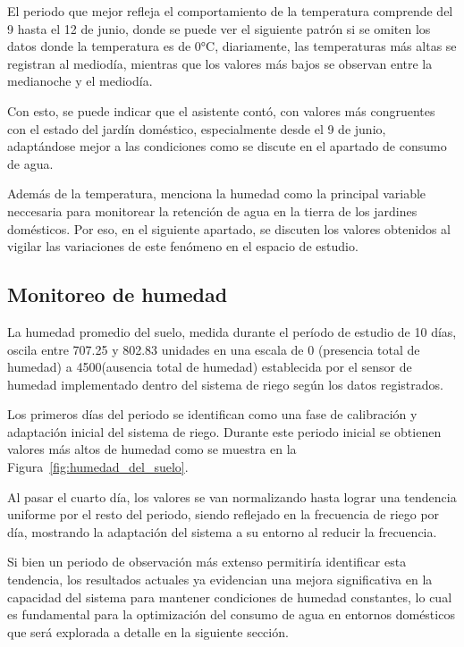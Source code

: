 \documentclass[pdflatex,sn-mathphys-num]{sn-jnl}%
\theoremstyle{thmstyleone}%
\theoremstyle{thmstyletwo}%
\theoremstyle{thmstylethree}%
\begin{document}
\begin{multicols}{2}
\justifying
El periodo que mejor refleja el comportamiento de la temperatura comprende del 9 hasta el 12 de junio, donde se puede ver el siguiente patrón si se omiten los datos donde la temperatura es de 0°C, diariamente, las temperaturas más altas se registran al mediodía, mientras que los valores más bajos se observan entre la medianoche y el mediodía. 

Con esto, se puede indicar que el asistente contó, con valores más congruentes con el estado del jardín doméstico, especialmente desde el 9 de junio, adaptándose mejor a las condiciones como se discute en el apartado de consumo de agua.

Además de la temperatura, \cite{ref12} menciona la humedad como la principal variable neccesaria para monitorear la retención de agua en la tierra de los jardines domésticos. Por eso, en el siguiente apartado, se discuten los valores obtenidos al vigilar las variaciones de este fenómeno en el espacio de estudio.
\subsection*{Monitoreo de humedad}

La humedad promedio del suelo, medida durante el período de estudio de 10 días, oscila entre 707.25 y 802.83 unidades en una escala de 0 (presencia total de humedad) a 4500(ausencia total de humedad) establecida por el sensor de humedad implementado dentro del sistema de riego según los datos registrados.

Los primeros días del periodo se identifican como una fase de calibración y adaptación inicial del sistema de riego. Durante este periodo inicial se obtienen valores más altos de humedad como se muestra en la Figura~\ref{fig:humedad_del_suelo}.

Al pasar el cuarto día, los valores se van normalizando hasta lograr una tendencia uniforme por el resto del periodo, siendo reflejado en la frecuencia de riego por día, mostrando la adaptación del sistema a su entorno al reducir la frecuencia.  

Si bien un periodo de observación más extenso permitiría identificar esta tendencia, los resultados actuales ya evidencian una mejora significativa en la capacidad del sistema para mantener condiciones de humedad constantes, lo cual es fundamental para la optimización del consumo de agua en entornos domésticos que será explorada a detalle en la siguiente sección.
\end{multicols}
\end{document}
